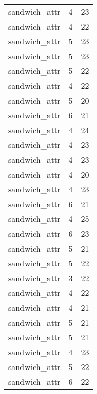 \begin{table}
\begin{tabular}{lrr}
                   sandwich\_attr &         4 &        23 \\
                   sandwich\_attr &         4 &        22 \\
                   sandwich\_attr &         5 &        23 \\
                   sandwich\_attr &         5 &        23 \\
                   sandwich\_attr &         5 &        22 \\
                   sandwich\_attr &         4 &        22 \\
                   sandwich\_attr &         5 &        20 \\
                   sandwich\_attr &         6 &        21 \\
                   sandwich\_attr &         4 &        24 \\
                   sandwich\_attr &         4 &        23 \\
                   sandwich\_attr &         4 &        23 \\
                   sandwich\_attr &         4 &        20 \\
                   sandwich\_attr &         4 &        23 \\
                   sandwich\_attr &         6 &        21 \\
                   sandwich\_attr &         4 &        25 \\
                   sandwich\_attr &         6 &        23 \\
                   sandwich\_attr &         5 &        21 \\
                   sandwich\_attr &         5 &        22 \\
                   sandwich\_attr &         3 &        22 \\
                   sandwich\_attr &         4 &        22 \\
                   sandwich\_attr &         4 &        21 \\
                   sandwich\_attr &         5 &        21 \\
                   sandwich\_attr &         5 &        21 \\
                   sandwich\_attr &         4 &        23 \\
                   sandwich\_attr &         5 &        22 \\
                   sandwich\_attr &         6 &        22 \\

\end{tabular}
\end{table}
